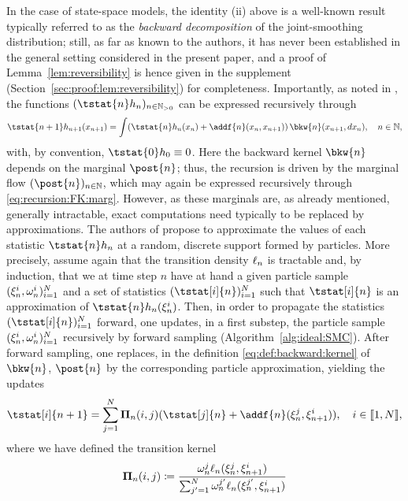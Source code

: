 In the case of state-space models, the identity (ii) above is a well-known result typically referred to as the \emph{backward decomposition} of the joint-smoothing distribution; still, as far as known to the authors, it has never been established in the general setting considered in the present paper, and a proof of Lemma~\ref{lem:reversibility} is hence given in the supplement (Section~\ref{sec:proof:lem:reversibility}) for completeness. Importantly, as noted in \cite{cappe:2009}, the functions $(\tstat{n} h_n)_{n \in \nsetpos}$ can be expressed recursively through  
\begin{equation} \label{eq:forward:smoothing}
\tstat{n + 1} h_{n + 1}(x_{n + 1}) = \int (\tstat{n} h_n(x_n) + \addf{n}(x_n, x_{n + 1})) \, \bkw{n}(x_{n + 1}, \rmd x_n), \quad n \in \nset, 
\end{equation}
with, by convention, $\tstat{0} h_0 \equiv 0$. Here the backward kernel $\bkw{n}$ depends on the marginal $\post{n}$; thus, the recursion is driven by the marginal flow $(\post{n})_{n \in \nset}$, which may again be expressed recursively through \eqref{eq:recursion:FK:marg}. However, as these marginals are, as already mentioned, generally intractable, exact computations need typically to be replaced by approximations. The authors of \cite{delmoral:doucet:singh:2010} propose to approximate the values of each statistic $\tstat{n} h_n$ at a random, discrete support formed by particles. More precisely, assume again that the transition density $\ell_{n}$ is tractable and, by induction, that we at time step $n$ have at hand a given particle sample $(\xi_{n}^{i}, \omega_{n}^{i})_{i = 1}^N$ and a set of statistics $(\tstat[i]{n})_{i = 1}^\N$ such that $\tstat[i]{n}$ is an approximation of $\tstat{n} h_n(\epart{n}{i})$. Then, in order to propagate the statistics $(\tstat[i]{n})_{i = 1}^\N$ forward, one updates, in a first substep, the particle sample $(\xi_{n}^{i}, \omega_{n}^{i})_{i = 1}^N$ recursively by forward sampling (Algorithm~\ref{alg:ideal:SMC}). After forward sampling, one replaces, in the definition \eqref{eq:def:backward:kernel} of $\bkw{n}$, $\post{n}$ by the corresponding particle approximation, yielding the updates 
\begin{equation} \label{eq:tstat:FFBSm:update}
\tstat[i]{n + 1} = \sum_{j = 1}^\N \trm{n}(i, j) (\tstat[j]{n} + \addf{n}(\epart{n}{j}, \epart{n + 1}{i})), \quad i \in \intvect{1}{\N}, 
\end{equation} 
where we have defined the transition kernel  
\begin{equation} \label{eq:def:trm}
\trm{n}(i, j) \eqdef \frac{\ewght{n}{j} \ud{n}(\epart{n}{j}, \epart{n + 1}{i})}{\sum_{j' = 1}^\N \ewght{n}{j'} \ud{n}(\epart{n}{j'}, \epart{n + 1}{i})}
\end{equation}
